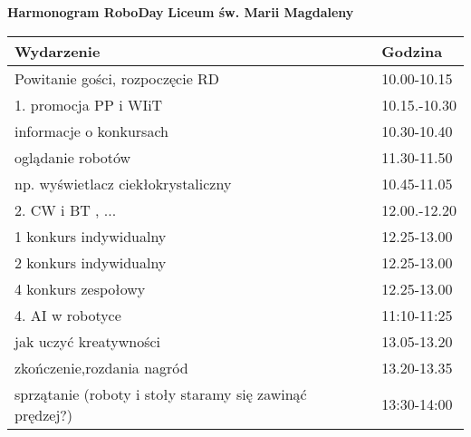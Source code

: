 \documentclass{article}
\begin{document}
\begin{center}
\Large\textbf{Harmonogram RoboDay}
\large\textbf{Liceum św. Marii Magdaleny}
\end{center}
\vspace{1cm}
\begin{center}
\begin{tabular}{|l|l|}
\hline
\textbf{Wydarzenie} & \textbf{Godzina} \\
\hline
Powitanie gości, rozpoczęcie RD & 10.00-10.15 \\
\hline
1. promocja PP i WIiT & 10.15.-10.30 \\
\hline
informacje o konkursach & 10.30-10.40 \\
\hline
oglądanie robotów & 11.30-11.50 \\
\hline
np. wyświetlacz ciekłokrystaliczny & 10.45-11.05 \\
\hline
2. CW i BT , ... & 12.00.-12.20 \\
\hline
1 konkurs indywidualny & 12.25-13.00 \\
\hline
2 konkurs indywidualny & 12.25-13.00 \\
\hline
4 konkurs zespołowy & 12.25-13.00 \\
\hline
4. AI w robotyce & 11:10-11:25 \\
\hline
jak uczyć kreatywności & 13.05-13.20 \\
\hline
zkończenie,rozdania nagród & 13.20-13.35 \\
\hline
sprzątanie (roboty i stoły staramy się zawinąć prędzej?) & 13:30-14:00 \\
\hline
\end{tabular}
\end{center}
\end{document}
